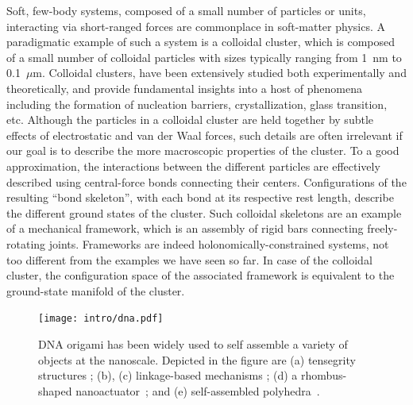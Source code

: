 Soft, few-body systems, composed of a small number of particles or units, interacting via short-ranged forces are commonplace in soft-matter physics.
A paradigmatic example of such a system is a colloidal cluster, which is composed of a small number of colloidal particles with sizes typically ranging from 1~nm to 0.1~$\mu$m.
Colloidal clusters, have been extensively studied both experimentally and theoretically, and provide fundamental insights into a host of phenomena including the formation of nucleation barriers, crystallization, glass transition, etc.
Although the particles in a colloidal cluster are held together by subtle effects of electrostatic and van der Waal forces, such details are often irrelevant if our goal is to describe the more macroscopic properties of the cluster.
To a good approximation, the interactions between the different particles are effectively described using central-force bonds connecting their centers.
Configurations of the resulting ``bond skeleton'', with each bond at its respective rest length, describe the different ground states of the cluster.
Such colloidal skeletons are an example of a mechanical framework, which is an assembly of rigid bars connecting freely-rotating joints.
Frameworks are indeed holonomically-constrained systems, not too different from the examples we have seen so far.
In case of the colloidal cluster, the configuration space of the associated framework is equivalent to the ground-state manifold of the cluster.
%
\begin{figure}
  \begin{center}
    \texttt{[image: intro/dna.pdf]}
  \end{center}
  \caption{DNA origami has been widely used to self assemble a variety of objects at the nanoscale.
Depicted in the figure are (a) tensegrity structures \cite{liedl2010}; (b), (c) linkage-based mechanisms \cite{marras2015,zhou2015}; (d) a rhombus-shaped nanoactuator~\cite{ke2016}; and (e) self-assembled polyhedra~\cite{iinuma2014}.}
  \label{fig:dna_origami}
\end{figure}



